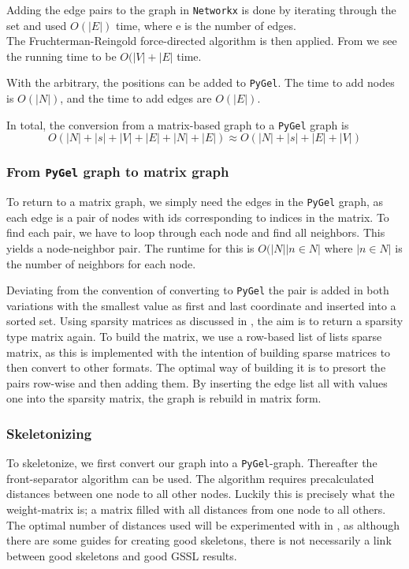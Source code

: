 \documentclass[10pt, letterpaper]{article}
\begin{document}
Adding the edge pairs to the graph in \texttt{Networkx} is done by iterating through the set and used $O(|E|)$ time, where e is the number of edges. \\

The Fruchterman-Reingold force-directed algorithm is then applied. From \cite{graphpositionalgo} we see the running time to be $O(|V| + |E|$ time. 

With the arbitrary, the positions can be added to \texttt{PyGel}. The time to add nodes is $O(|N|)$, and the time to add edges are $O(|E|)$.

In total, the conversion from a matrix-based graph to a \texttt{PyGel} graph is 
$$
    O(|N| + |s| + |V| + |E| + |N| + |E|) \approx O(|N| + |s| + |E| + |V|)
$$

\subsubsection{From \texttt{PyGel} graph to matrix graph}
To return to a matrix graph, we simply need the edges in the \texttt{PyGel} graph, as each edge is a pair of nodes with ids corresponding to indices in the matrix. To find each pair, we have to loop through each node and find all neighbors. This yields a node-neighbor pair. The runtime for this is $O(|N||n \in N|$ where $|n \in N|$ is the number of neighbors for each node.

Deviating from the convention of converting to \texttt{PyGel} the pair is added in both variations with the smallest value as first and last coordinate and inserted into a sorted set. Using sparsity matrices as discussed in , the aim is to return a sparsity type matrix again. To build the matrix, we use a row-based list of lists sparse matrix, as this is implemented with the intention of building sparse matrices to then convert to other formats. The optimal way of building it is to presort the pairs row-wise and then adding them. By inserting the edge list all with values one into the sparsity matrix, the graph is rebuild in matrix form.

\subsubsection{Skeletonizing}
To skeletonize, we first convert our graph into a \texttt{PyGel}-graph. Thereafter the front-separator algorithm can be used. The algorithm requires precalculated distances between one node to all other nodes. Luckily this is precisely what the weight-matrix is; a matrix filled with all distances from one node to all others. The optimal number of distances used will be experimented with in , as although there are some guides for creating good skeletons, there is not necessarily a link between good skeletons and good GSSL results.
\end{document}
